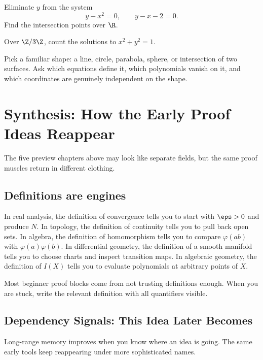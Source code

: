 \begin{exercise}
Eliminate $y$ from the system
\[
y-x^2=0,\qquad y-x-2=0.
\]
Find the intersection points over $\R$.
\end{exercise}

\begin{exercise}
Over $\Z/3\Z$, count the solutions to $x^2+y^2=1$.
\end{exercise}

\begin{walkbox}
Pick a familiar shape: a line, circle, parabola, sphere, or intersection of two
surfaces. Ask which equations define it, which polynomials vanish on it, and
which coordinates are genuinely independent on the shape.
\end{walkbox}

\section{Synthesis: How the Early Proof Ideas Reappear}

The five preview chapters above may look like separate fields, but the same
proof muscles return in different clothing.

\subsection{Definitions are engines}

In real analysis, the definition of convergence tells you to start with
$\eps>0$ and produce $N$. In topology, the definition of continuity tells you to
pull back open sets. In algebra, the definition of homomorphism tells you to
compare $\varphi(ab)$ with $\varphi(a)\varphi(b)$. In differential geometry,
the definition of a smooth manifold tells you to choose charts and inspect
transition maps. In algebraic geometry, the definition of $I(X)$ tells you to
evaluate polynomials at arbitrary points of $X$.

\begin{focusbox}
Most beginner proof blocks come from not trusting definitions enough. When you
are stuck, write the relevant definition with all quantifiers visible.
\end{focusbox}

\subsection{Dependency Signals: This Idea Later Becomes}

Long-range memory improves when you know where an idea is going. The same early
tools keep reappearing under more sophisticated names.

